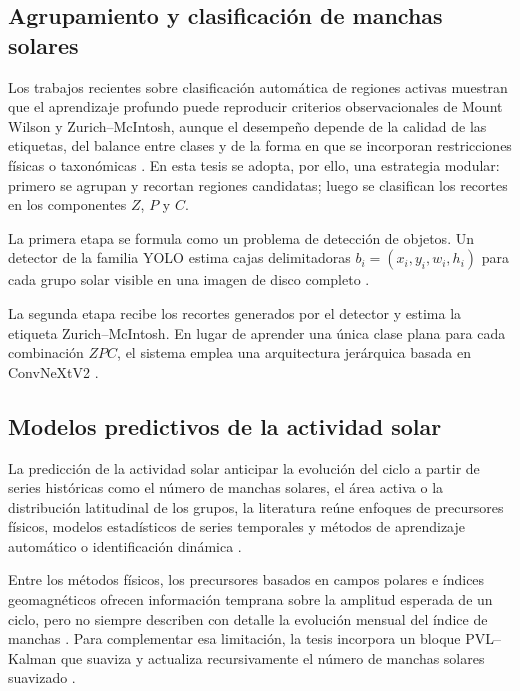 \subsection{Agrupamiento y clasificación de manchas solares}

Los trabajos recientes sobre clasificación automática de regiones activas muestran que el aprendizaje profundo puede reproducir criterios observacionales de Mount Wilson y Zurich--McIntosh, aunque el desempeño depende de la calidad de las etiquetas, del balance entre clases y de la forma en que se incorporan restricciones físicas o taxonómicas \citep{sayez2023sunscc,zhou2023mcintosh,deng2025mcintosh}. En esta tesis se adopta, por ello, una estrategia modular: primero se agrupan y recortan regiones candidatas; luego se clasifican los recortes en los componentes $Z$, $P$ y $C$.

La primera etapa se formula como un problema de detección de objetos. Un detector de la familia YOLO estima cajas delimitadoras $b_i=(x_i,y_i,w_i,h_i)$ para cada grupo solar visible en una imagen de disco completo \citep{ultralyticsYOLO26,robUSET2026,noaaSRS,scherrer2012hmi}.

La segunda etapa recibe los recortes generados por el detector y estima la etiqueta Zurich--McIntosh. En lugar de aprender una única clase plana para cada combinación $ZPC$, el sistema emplea una arquitectura jerárquica basada en ConvNeXtV2 \citep{woo2023convnextv2,mcintosh1990classification}.

\subsection{Modelos predictivos de la actividad solar}

La predicción de la actividad solar anticipar la evolución del ciclo a partir de series históricas como el número de manchas solares, el área activa o la distribución latitudinal de los grupos, la literatura reúne enfoques de precursores físicos, modelos estadísticos de series temporales y métodos de aprendizaje automático o identificación dinámica \citep{pesnell2012predictions,clette2014revisiting,camporeale2019ml}.

Entre los métodos físicos, los precursores basados en campos polares e índices geomagnéticos ofrecen información temprana sobre la amplitud esperada de un ciclo, pero no siempre describen con detalle la evolución mensual del índice de manchas \citep{schatten2005precursor,svalgaard2005polar}. Para complementar esa limitación, la tesis incorpora un bloque PVL--Kalman que suaviza y actualiza recursivamente el número de manchas solares suavizado \citep{kalman1960newapproach,podladchikova2012kalman}.

